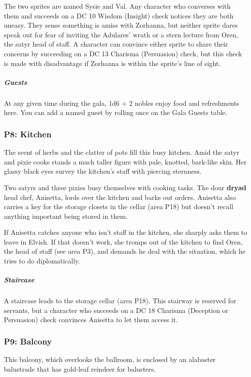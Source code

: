 \documentclass[10pt,a4paper,twoside,bg=print,twocolumn,openany,nodeprecatedcode]{dndbook}
\begin{document}
The two sprites are named Sysie and Val. Any character who converses with them and succeeds on a DC 10 Wisdom (Insight) check notices they are both uneasy. They sense something is amiss with Zorhanna, but neither sprite dares speak out for fear of inviting the Adulares' wrath or a stern lecture from Oren, the satyr head of staff. A character can convince either sprite to share their concerns by succeeding on a DC 13 Charisma (Persuasion) check, but this check is made with disadvantage if Zorhanna is within the sprite's line of sight.

\subparagraph{Guests}
At any given time during the gala, 1d6 + 2 nobles enjoy food and refreshments here. You can add a named guest by rolling once on the Gala Guests table.

\subsubsection{P8: Kitchen}
\begin{DndReadAloud}{}
The scent of herbs and the clatter of pots fill this busy kitchen. Amid the satyr and pixie cooks stands a much taller figure with pale, knotted, bark-like skin. Her glassy black eyes survey the kitchen's staff with piercing sternness.

\end{DndReadAloud}

Two satyrs and three pixies busy themselves with cooking tasks. The dour \textbf{dryad} head chef, Anisetta, lords over the kitchen and barks out orders. Anisetta also carries a key for the storage closets in the cellar (area P18) but doesn't recall anything important being stored in them.

If Anisetta catches anyone who isn't staff in the kitchen, she sharply asks them to leave in Elvish. If that doesn't work, she tromps out of the kitchen to find Oren, the head of staff (see area P3), and demands he deal with the situation, which he tries to do diplomatically.

\subparagraph{Staircase}
A staircase leads to the storage cellar (area P18). This stairway is reserved for servants, but a character who succeeds on a DC 18 Charisma (Deception or Persuasion) check convinces Anisetta to let them access it.

\subsubsection{P9: Balcony}
\begin{DndReadAloud}{}
This balcony, which overlooks the ballroom, is enclosed by an alabaster balustrade that has gold-leaf reindeer for balusters.

\end{DndReadAloud}
\end{document}
